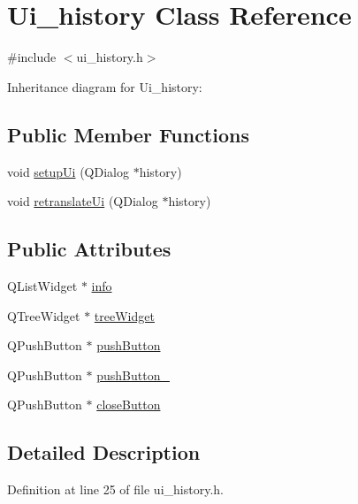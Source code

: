 \hypertarget{classUi__history}{
\section{Ui\_\-history Class Reference}
\label{classUi__history}
}


{\ttfamily \#include $<$ui\_\-history.h$>$}



Inheritance diagram for Ui\_\-history:
\subsection*{Public Member Functions}
\begin{DoxyCompactItemize}
\item 
void \hyperlink{classUi__history_a2fca8cb3073919a83d20d8beb211e489}{setupUi} (QDialog $\ast$history)
\item 
void \hyperlink{classUi__history_a09bc4c4501c23a46385d4dde46f2ac37}{retranslateUi} (QDialog $\ast$history)
\end{DoxyCompactItemize}
\subsection*{Public Attributes}
\begin{DoxyCompactItemize}
\item 
QListWidget $\ast$ \hyperlink{classUi__history_ad735c929553117f86647de09fef4bc7c}{info}
\item 
QTreeWidget $\ast$ \hyperlink{classUi__history_a276cc06c05a31289ab6d85cbdf233f50}{treeWidget}
\item 
QPushButton $\ast$ \hyperlink{classUi__history_a7691a5d3d60ce064af93e73a3a784630}{pushButton}
\item 
QPushButton $\ast$ \hyperlink{classUi__history_a2d6dfc354da94241b8d00b1a15e2f6b9}{pushButton\_}
\item 
QPushButton $\ast$ \hyperlink{classUi__history_a9e18bf35bee38f50a27f4ef1425fae28}{closeButton}
\end{DoxyCompactItemize}


\subsection{Detailed Description}


Definition at line 25 of file ui\_\-history.h.



